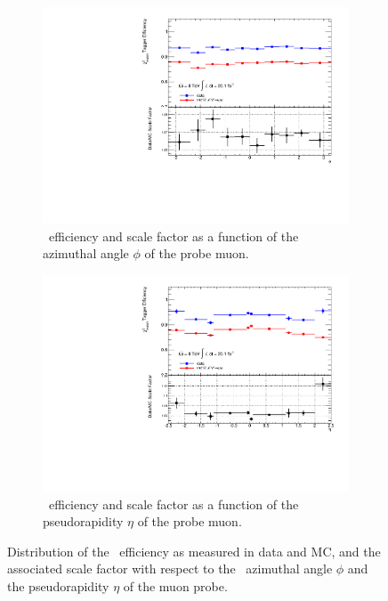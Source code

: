 \begin{figure}[htbp]
  \centering
  \begin{subfigure}[b]{0.75\textwidth}
      \includegraphics[width=\textwidth]{PartCalibration2012/Plots/SFPlots/phi_smt.pdf}
      \caption{\xsm\ efficiency and scale factor as a function of the azimuthal angle $\phi$ of the probe muon.}
    \label{fig:CalibrationPhi}
  \end{subfigure}

  \begin{subfigure}[b]{0.75\textwidth}
      \includegraphics[width=\textwidth]{PartCalibration2012/Plots/SFPlots/eta_smt.pdf}
      \caption{\xsm\ efficiency and scale factor as a function of the pseudorapidity $\eta$ of the probe muon.}
    \label{fig:CalibrationEta}
  \end{subfigure}
  \caption[Distribution of the \xsm\ efficiency as measured in data and MC, and the associated scale factor with respect to the azimuthal angle $\phi$ and the pseudorapidity $\eta$ of the muon probe.]{Distribution of the \xsm\ efficiency as measured in data and MC, and the associated scale factor with respect to the~ azimuthal angle $\phi$ and~ the pseudorapidity $\eta$ of the muon probe.}
  \label{fig:CalibrationAngularResults}
\end{figure}

